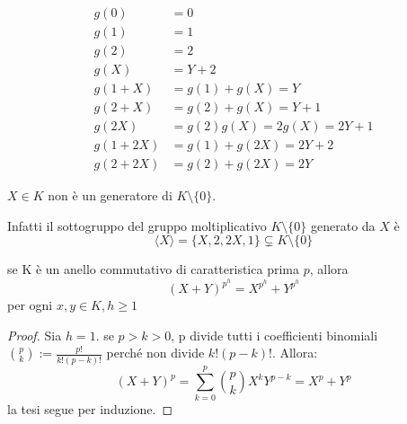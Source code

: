 \documentclass[../main.tex]{subfiles}
\begin{document}
\begin{example}
\begin{multicols}{2}
        \columnbreak

        \begin{align*}
            g(0)      & = 0                         \\
            g(1)      & = 1                         \\
            g(2)      & = 2                         \\
            g(X)      & = Y + 2                     \\
            g(1 + X)  & = g(1) + g(X) = Y           \\
            g(2 + X)  & = g(2) + g(X) = Y + 1       \\
            g(2X)     & = g(2)g(X) = 2g(X) = 2Y + 1 \\
            g(1 + 2X) & = g(1) + g(2X) = 2Y + 2     \\
            g(2 + 2X) & = g(2) + g(2X) = 2Y
        \end{align*}
    \end{multicols}
\end{example}

\begin{remark}
    $X \in K$ non è un generatore di $K \setminus \{0\}$.

    Infatti il sottogruppo del gruppo moltiplicativo $K \setminus \{0\}$ generato da $X$ è
    \begin{equation*}
        \langle X\rangle = \{X, 2, 2X, 1\} \subsetneq K \setminus \{0\}
    \end{equation*}
\end{remark}

\begin{lemma}
    se K è un anello commutativo di caratteristica prima $p$, allora
    \begin{equation*}
        (X + Y)^{p^h} = X^{p^h} + Y^{p^h}
    \end{equation*}
    per ogni $x, y \in K, h \geq 1$
\end{lemma}

\begin{proof}
    Sia $h = 1$. se $p > k > 0$, p divide tutti i coefficienti binomiali $\binom{p}{k} := \frac{p!}{k!(p-k)!}$ perché non divide $k!(p-k)!$. Allora:
    \begin{equation*}
        (X + Y)^p = \sum_{k=0}^{p} \binom{p}{k} X^k Y^{p-k} = X^p + Y^p
    \end{equation*}
    la tesi segue per induzione.
\end{proof}
\end{document}
